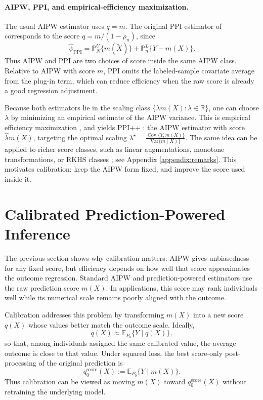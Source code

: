 \documentclass{article}
\theoremstyle{plain}
\theoremstyle{definition}
\newcommand{\E}{\mathbb{E}}
\newcommand{\Var}{\mathrm{Var}}
\newcommand{\1}{\mathbf{1}}
\newcommand{\Pl}{\mathbb{P}^{L}_n}
\newcommand{\Pu}{\mathbb{P}^{U}_N}
\newcommand{\Cov}{\operatorname{Cov}}
\begin{document}
\paragraph{AIPW, PPI, and empirical-efficiency maximization.}
The usual AIPW estimator uses \(q=m\). The original PPI estimator of
\citet{ppi2023} corresponds to the score \(q=m/(1-\rho_n)\), since
\[
\widehat{\psi}_{\mathrm{PPI}}
=
\Pu\{m(\widetilde X)\}+\Pl\{Y-m(X)\}.
\]
Thus AIPW and PPI are two choices of score inside the same AIPW class. Relative
to AIPW with score \(m\), PPI omits the labeled-sample covariate average from
the plug-in term, which can reduce efficiency when the raw score is already a
good regression adjustment.

Because both estimators lie in the scaling class
\(\{\lambda m(X):\lambda\in\mathbb R\}\), one can choose \(\lambda\) by
minimizing an empirical estimate of the AIPW variance. This is empirical
efficiency maximization \citep{rubin2008empirical}, and yields PPI++
\citep{angelopoulos2023ppi}: the AIPW estimator with score
\(\hat\lambda m(X)\), targeting the optimal scaling $\lambda^\star
=
\frac{\Cov\{Y,m(X)\}}{\Var\{m(X)\}}.$
The same idea can be applied to richer score classes, such as linear
augmentations, monotone transformations, or RKHS classes
\citep{rubin2008empirical,vanderlaanunified}; see
Appendix \ref{appendix:remarks}. This motivates calibration: keep the AIPW form
fixed, and improve the score used inside it.

\section{Calibrated Prediction-Powered Inference}
\label{sec:calppi}

The previous section shows why calibration matters: AIPW gives unbiasedness for
any fixed score, but efficiency depends on how well that score approximates the
outcome regression. Standard AIPW and prediction-powered estimators use the raw
prediction score \(m(X)\). In applications, this score may rank individuals well
while its numerical scale remains poorly aligned with the outcome.

Calibration addresses this problem by transforming \(m(X)\) into a new score
\(q(X)\) whose values better match the outcome scale. Ideally,
\[
q(X) \approx \E_{P_0}\{Y\mid q(X)\},
\]
so that, among individuals assigned the same calibrated value, the average
outcome is close to that value. Under squared loss, the best score-only
post-processing of the original prediction is
\[
q_0^{\mathrm{score}}(X) := \E_{P_0}\{Y\mid m(X)\}.
\]
Thus calibration can be viewed as moving \(m(X)\) toward
\(q_0^{\mathrm{score}}(X)\) without retraining the underlying model.
\end{document}
